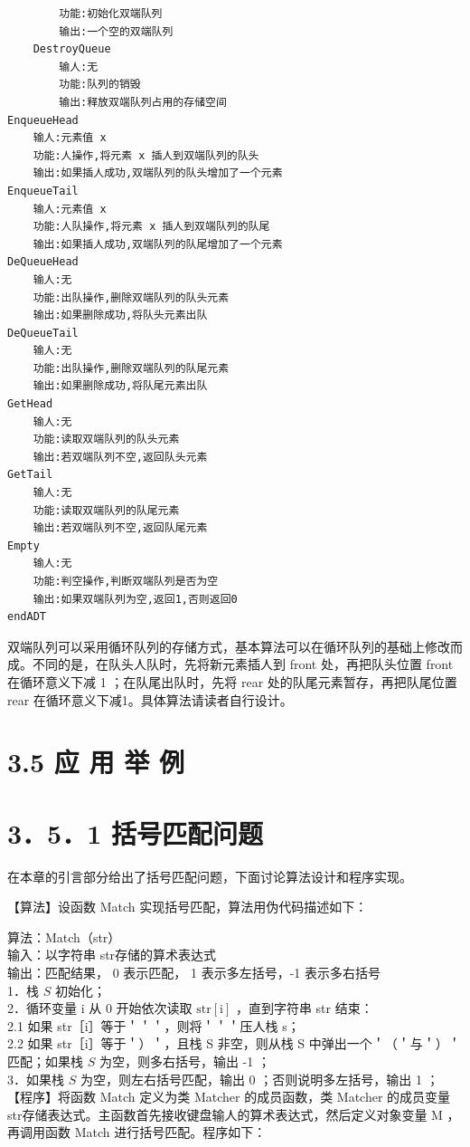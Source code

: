 \documentclass[10pt]{article}
\begin{document}
\begin{verbatim}
        功能:初始化双端队列
        输出:一个空的双端队列
    DestroyQueue
        输人:无
        功能:队列的销毁
        输出:释放双端队列占用的存储空间
EnqueueHead
    输人:元素值 x
    功能:人操作,将元素 x 插人到双端队列的队头
    输出:如果插人成功,双端队列的队头增加了一个元素
EnqueueTail
    输人:元素值 x
    功能:人队操作,将元素 x 插人到双端队列的队尾
    输出:如果插人成功,双端队列的队尾增加了一个元素
DeQueueHead
    输人:无
    功能:出队操作,删除双端队列的队头元素
    输出:如果删除成功,将队头元素出队
DeQueueTail
    输人:无
    功能:出队操作,删除双端队列的队尾元素
    输出:如果删除成功,将队尾元素出队
GetHead
    输人:无
    功能:读取双端队列的队头元素
    输出:若双端队列不空,返回队头元素
GetTail
    输人:无
    功能:读取双端队列的队尾元素
    输出:若双端队列不空,返回队尾元素
Empty
    输人:无
    功能:判空操作,判断双端队列是否为空
    输出:如果双端队列为空,返回1,否则返回0
endADT
\end{verbatim}

双端队列可以采用循环队列的存储方式，基本算法可以在循环队列的基础上修改而成。不同的是，在队头人队时，先将新元素插人到 front 处，再把队头位置 front 在循环意义下减 1 ；在队尾出队时，先将 rear 处的队尾元素暂存，再把队尾位置 rear 在循环意义下减1。具体算法请读者自行设计。

\section*{3.5 应 用 举 例}
\section*{3．5．1 括号匹配问题}
在本章的引言部分给出了括号匹配问题，下面讨论算法设计和程序实现。

【算法】设函数 Match 实现括号匹配，算法用伪代码描述如下：

算法：Match（str）\\
输入：以字符串 str存储的算术表达式\\
输出：匹配结果， 0 表示匹配， 1 表示多左括号，-1 表示多右括号\\
1．栈 $S$ 初始化；\\
2．循环变量 i 从 0 开始依次读取 $\mathrm{str}[\mathrm{i}]$ ，直到字符串 str 结束：\\
2.1 如果 str［i］等于＇＇＇，则将＇＇＇压人栈 s；\\
2.2 如果 str［i］等于＇）＇，且栈 S 非空，则从栈 S 中弹出一个＇（＇与＇）＇匹配；如果栈 $S$ 为空，则多右括号，输出 -1 ；\\
3．如果栈 $S$ 为空，则左右括号匹配，输出 0 ；否则说明多左括号，输出 1 ；\\
【程序】将函数 Match 定义为类 Matcher 的成员函数，类 Matcher 的成员变量 str存储表达式。主函数首先接收键盘输人的算术表达式，然后定义对象变量 M ，再调用函数 Match 进行括号匹配。程序如下：
\end{document}
